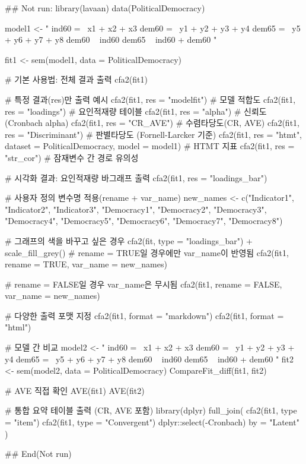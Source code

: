 \documentclass[a4paper]{book}
\begin{document}
%
\begin{Examples}
\begin{ExampleCode}
\#\# Not run: 
library(lavaan)
data(PoliticalDemocracy)

model1 <- "
  ind60 =~ x1 + x2 + x3
  dem60 =~ y1 + y2 + y3 + y4
  dem65 =~ y5 + y6 + y7 + y8
  dem60 ~ ind60
  dem65 ~ ind60 + dem60
"

fit1 <- sem(model1, data = PoliticalDemocracy)

# 기본 사용법: 전체 결과 출력
cfa2(fit1)

# 특정 결과(res)만 출력 예시
cfa2(fit1, res = "modelfit")        # 모델 적합도
cfa2(fit1, res = "loadings")        # 요인적재량 테이블
cfa2(fit1, res = "alpha")           # 신뢰도(Cronbach alpha)
cfa2(fit1, res = "CR_AVE")          # 수렴타당도(CR, AVE)
cfa2(fit1, res = "Discriminant")    # 판별타당도 (Fornell-Larcker 기준)
cfa2(fit1, res = "htmt", dataset = PoliticalDemocracy, model = model1)  # HTMT 지표
cfa2(fit1, res = "str_cor")         # 잠재변수 간 경로 유의성

# 시각화 결과: 요인적재량 바그래프 출력
cfa2(fit1, res = "loadings_bar")

# 사용자 정의 변수명 적용(rename + var_name)
new_names <- c("Indicator1", "Indicator2", "Indicator3",
               "Democracy1", "Democracy2", "Democracy3", "Democracy4",
               "Democracy5", "Democracy6", "Democracy7", "Democracy8")

# 그래프의 색을 바꾸고 싶은 경우
cfa2(fit, type = "loadings_bar") +
scale_fill_grey()
# rename = TRUE일 경우에만 var_name이 반영됨
cfa2(fit1, rename = TRUE, var_name = new_names)

# rename = FALSE일 경우 var_name은 무시됨
cfa2(fit1, rename = FALSE, var_name = new_names)

# 다양한 출력 포맷 지정
cfa2(fit1, format = "markdown")
cfa2(fit1, format = "html") %

# 모델 간 비교
model2 <- "
  ind60 =~ x1 + x2 + x3
  dem60 =~ y1 + y2 + y3 + y4
  dem65 =~ y5 + y6 + y7 + y8
  dem60 ~ ind60
  dem65 ~ ind60 + dem60
"
fit2 <- sem(model2, data = PoliticalDemocracy)
CompareFit_diff(fit1, fit2)

# AVE 직접 확인
AVE(fit1)
AVE(fit2)

# 통합 요약 테이블 출력 (CR, AVE 포함)
library(dplyr)
full_join(
  cfa2(fit1, type = "item") %
  cfa2(fit1, type = "Convergent") %
    dplyr::select(-Cronbach) %
  by = "Latent"
) %

## End(Not run)
\end{ExampleCode}
\end{Examples}
\end{document}
